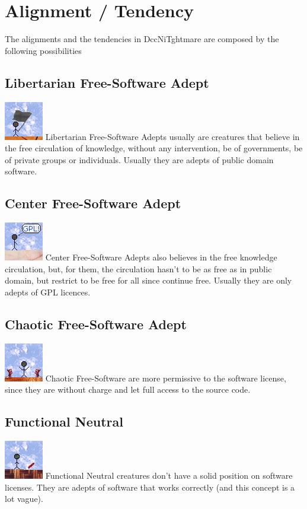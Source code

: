 \documentclass[ letterpaper,12pt]{article}
\begin{document}
\section{Alignment / Tendency}

The alignments and the tendencies in DccNiTghtmare are composed by the following possibilities\\

\subsection{Libertarian Free-Software Adept}\includegraphics{../data/alignment/Img/libertarian.png} Libertarian Free-Software Adepts usually are creatures that believe in the free circulation of knowledge, without any intervention, be of governments, be of private groups or individuals. Usually they are adepts of public domain software.

\subsection{Center Free-Software Adept}\includegraphics{../data/alignment/Img/gnu.png} Center Free-Software Adepts also believes in the free knowledge circulation, but, for them, the circulation hasn't to be as free as in public domain, but restrict to be free for all since continue free. Usually they are only adepts of GPL licences.

\subsection{Chaotic Free-Software Adept}\includegraphics{../data/alignment/Img/beastie.png} Chaotic Free-Software are more permissive to the software license, since they are without charge and let full access to the source code.

\subsection{Functional Neutral} \includegraphics{../data/alignment/Img/canivete.png} Functional Neutral creatures don't have a solid position on software licenses. They are adepts of software that works correctly (and this concept is a lot vague).
\end{document}
